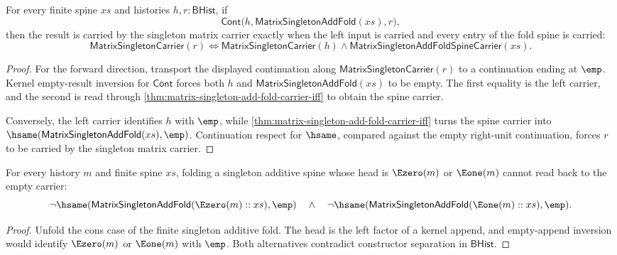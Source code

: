 \begin{theorem}
\label{thm:matrix-singleton-add-fold-continuation-result-iff}
For every finite spine $xs$ and histories $h,r:\mathsf{BHist}$, if
$$
\mathsf{Cont}\bigl(h,\mathsf{MatrixSingletonAddFold}(xs),r\bigr),
$$
then the result is carried by the singleton matrix carrier exactly when the
left input is carried and every entry of the fold spine is carried:
$$
\mathsf{MatrixSingletonCarrier}(r)
\Longleftrightarrow
\mathsf{MatrixSingletonCarrier}(h)\land
\mathsf{MatrixSingletonAddFoldSpineCarrier}(xs).
$$
\end{theorem}
\begin{proof}
For the forward direction, transport the displayed continuation along
$\mathsf{MatrixSingletonCarrier}(r)$ to a continuation ending at $\emp$.
Kernel empty-result inversion for $\mathsf{Cont}$ forces both $h$ and
$\mathsf{MatrixSingletonAddFold}(xs)$ to be empty. The first equality is the
left carrier, and the second is read through
\autoref{thm:matrix-singleton-add-fold-carrier-iff} to obtain the spine
carrier.

Conversely, the left carrier identifies $h$ with $\emp$, while
\autoref{thm:matrix-singleton-add-fold-carrier-iff} turns the spine carrier
into $\hsame(\mathsf{MatrixSingletonAddFold}(xs),\emp)$. Continuation
respect for $\hsame$, compared against the empty right-unit continuation,
forces $r$ to be carried by the singleton matrix carrier.
\end{proof}

\begin{theorem}
\label{thm:matrix-singleton-add-fold-visible-head-absurd}
For every history $m$ and finite spine $xs$, folding a singleton additive spine
whose head is $\Ezero(m)$ or $\Eone(m)$ cannot read back to the empty carrier:
$$
\neg\hsame(\mathsf{MatrixSingletonAddFold}(\Ezero(m)::xs),\emp)
\quad\wedge\quad
\neg\hsame(\mathsf{MatrixSingletonAddFold}(\Eone(m)::xs),\emp).
$$
\end{theorem}
\begin{proof}
Unfold the cons case of the finite singleton additive fold. The head is the
left factor of a kernel append, and empty-append inversion would identify
$\Ezero(m)$ or $\Eone(m)$ with $\emp$. Both alternatives contradict constructor
separation in $\mathsf{BHist}$.
\end{proof}

